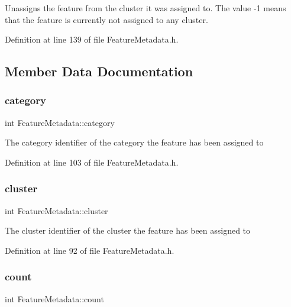 Unassigns the feature from the cluster it was assigned to. The value -\/1 means that the feature is currently not assigned to any cluster. 

Definition at line 139 of file Feature\+Metadata.\+h.



\subsection{Member Data Documentation}
\mbox{\label{class_feature_metadata_a30e96aabc8090f41b8136cbb274da383}} 
\subsubsection{\texorpdfstring{category}{category}}
{\footnotesize\ttfamily int Feature\+Metadata\+::category\hspace{0.3cm}{\ttfamily [protected]}}

The category identifier of the category the feature has been assigned to 

Definition at line 103 of file Feature\+Metadata.\+h.

\mbox{\label{class_feature_metadata_a7f5a6347721de970e0dd5abf4b0a8455}} 
\subsubsection{\texorpdfstring{cluster}{cluster}}
{\footnotesize\ttfamily int Feature\+Metadata\+::cluster\hspace{0.3cm}{\ttfamily [protected]}}

The cluster identifier of the cluster the feature has been assigned to 

Definition at line 92 of file Feature\+Metadata.\+h.

\mbox{\label{class_feature_metadata_a722c6a86c099fc76fe4d25aedaf98c1c}} 
\subsubsection{\texorpdfstring{count}{count}}
{\footnotesize\ttfamily int Feature\+Metadata\+::count\hspace{0.3cm}{\ttfamily [protected]}}

